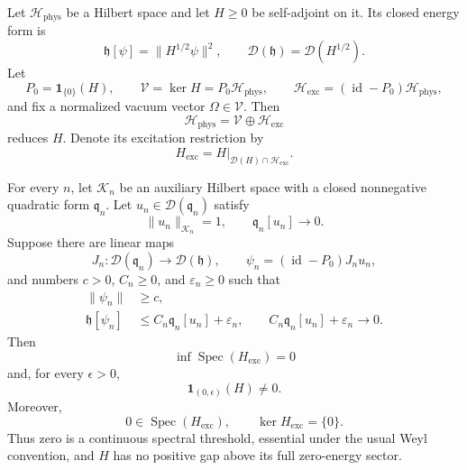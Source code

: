 \begin{proposition}
\label{cusp-gauge-no-gap-bridge}
Let \(\mathcal H_{\mathrm{phys}}\) be a Hilbert space and let \(H\ge0\) be
self-adjoint on it.  Its closed energy form is
\begin{equation}
 \mathfrak h[\psi]=\lVert H^{1/2}\psi\rVert^2,\qquad
 \mathcal D(\mathfrak h)=\mathcal D(H^{1/2}).
 \label{cusp-gauge-physical-energy-form}
\end{equation}
Let
\begin{equation}
 P_0=\mathbf 1_{\{0\}}(H),\qquad
 \mathcal V=\ker H=P_0\mathcal H_{\mathrm{phys}},\qquad
 \mathcal H_{\mathrm{exc}}
 =(\operatorname{id}-P_0)\mathcal H_{\mathrm{phys}},
 \label{cusp-gauge-vacuum-excitation-spaces}
\end{equation}
and fix a normalized vacuum vector \(\Omega\in\mathcal V\).  Then
\begin{equation}
 \mathcal H_{\mathrm{phys}}
 =\mathcal V\oplus\mathcal H_{\mathrm{exc}}
 \label{cusp-gauge-reducing-decomposition}
\end{equation}
reduces \(H\).  Denote its excitation restriction by
\[
 H_{\mathrm{exc}}
 =H|_{\mathcal D(H)\cap\mathcal H_{\mathrm{exc}}}.
\]

For every \(n\), let \(\mathcal K_n\) be an auxiliary Hilbert space with a
closed nonnegative quadratic form \(\mathfrak q_n\).  Let
\(u_n\in\mathcal D(\mathfrak q_n)\) satisfy
\begin{equation}
 \lVert u_n\rVert_{\mathcal K_n}=1,\qquad
 \mathfrak q_n[u_n]\longrightarrow0.
 \label{cusp-gauge-auxiliary-soft-states}
\end{equation}
Suppose there are linear maps
\begin{equation}
 J_n:\mathcal D(\mathfrak q_n)\longrightarrow\mathcal D(\mathfrak h),
 \qquad
 \psi_n=(\operatorname{id}-P_0)J_nu_n,
 \label{cusp-gauge-bridge-maps}
\end{equation}
and numbers \(c>0\), \(C_n\ge0\), and \(\varepsilon_n\ge0\) such that
\begin{align}
 \lVert\psi_n\rVert&\ge c,
 \label{cusp-gauge-bridge-norm}\\
 \mathfrak h[\psi_n]
 &\le C_n\mathfrak q_n[u_n]+\varepsilon_n,
 \qquad
 C_n\mathfrak q_n[u_n]+\varepsilon_n\longrightarrow0.
 \label{cusp-gauge-bridge-energy}
\end{align}
Then
\begin{equation}
 \inf\operatorname{Spec}(H_{\mathrm{exc}})=0
 \label{cusp-gauge-bridge-zero-infimum}
\end{equation}
and, for every \(\epsilon>0\),
\begin{equation}
 \mathbf 1_{(0,\epsilon)}(H)\ne0.
 \label{cusp-gauge-bridge-spectrum-near-zero}
\end{equation}
Moreover,
\begin{equation}
 0\in\operatorname{Spec}(H_{\mathrm{exc}}),\qquad
 \ker H_{\mathrm{exc}}=\{0\}.
 \label{cusp-gauge-bridge-continuous-threshold}
\end{equation}
Thus zero is a continuous spectral threshold, essential under the usual
Weyl convention, and \(H\) has no positive gap above its full zero-energy
sector.


\end{proposition}

